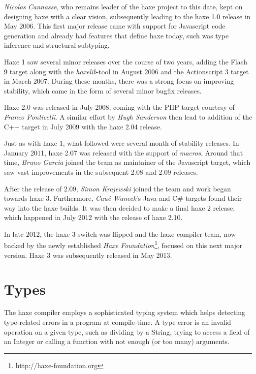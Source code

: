 \documentclass{article}
\newcommand{\target}[1]{#1}
\begin{document}
\emph{Nicolas Cannasse}, who remains leader of the haxe project to this date, kept on designing haxe with a clear vision, subsequently leading to the haxe 1.0 release in May 2006. This first major release came with support for \target{Javascript} code generation and already had features that define haxe today, such was type inference and structural subtyping.

Haxe 1 saw several minor releases over the course of two years, adding the \target{Flash 9} target along with the \emph{haxelib}-tool in August 2006 and the \target{Actionscript 3} target in March 2007. During these months, there was a strong focus on improving stability, which came in the form of several minor bugfix releases.

Haxe 2.0 was released in July 2008, coming with the \target{PHP} target courtesy of \emph{Franco Ponticelli}. A similar effort by \emph{Hugh Sanderson} then lead to addition of the \target{C++} target in July 2009 with the haxe 2.04 release.

Just as with haxe 1, what followed were several month of stability releases. In January 2011, haxe 2.07 was released with the support of \emph{macros}. Around that time, \emph{Bruno Garcia} joined the team as maintainer of the \target{Javascript} target, which saw vast improvements in the subsequent 2.08 and 2.09 releases.

After the release of 2.09, \emph{Simon Krajewski} joined the team and work began towards haxe 3. Furthermore, \emph{Cau\^{e} Waneck}'s \target{Java} and \target{C\#} targets found their way into the haxe builds. It was then decided to make a final haxe 2 release, which happened in July 2012 with the release of haxe 2.10.

In late 2012, the haxe 3 switch was flipped and the haxe compiler team, now backed by the newly established \emph{Haxe Foundation}\footnote{http://haxe-foundation.org}, focused on this next major version. Haxe 3 was subsequently released in May 2013.


\section{Types}
\label{Types}

The haxe compiler employs a sophisticated typing system which helps detecting type-related errors in a program at compile-time. A type error is an invalid operation on a given type, such as dividing by a String, trying to access a field of an Integer or calling a function with not enough (or too many) arguments.
\end{document}
